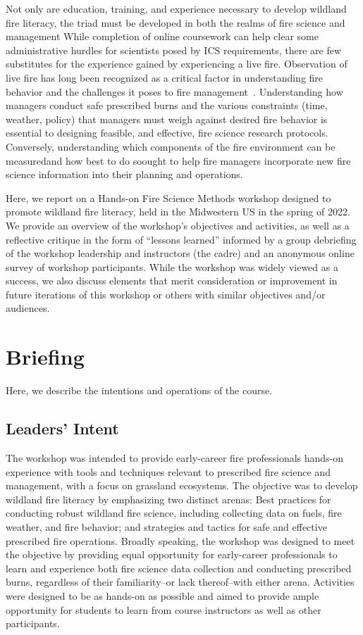 \documentclass[fire,casereport,accept,moreauthors,pdftex]{Definitions/mdpi}  %
\begin{document}
Not only are education, training, and experience necessary to develop wildland fire literacy, the triad must be developed in both the realms of fire science and management 
While completion of online coursework can help clear some administrative hurdles for scientists posed by ICS requirements, there are few substitutes for the experience gained by experiencing a live fire.
Observation of live fire has long been recognized as a critical factor in understanding fire behavior and the challenges it poses to fire management~\citep{alexander1990, andrews1989}.
Understanding how managers conduct safe prescribed burns and the various constraints (time, weather, policy) that managers must weigh against desired fire behavior is essential to designing feasible, and effective, fire science research protocols.
Conversely, understanding which components of the fire environment can be measured\textemdash and how best to do so\textemdash ought to help fire managers incorporate new fire science information into their planning and operations.

Here, we report on a Hands-on Fire Science Methods workshop designed to promote wildland fire literacy, held in the Midwestern US in the spring of 2022.
We provide an overview of the workshop's objectives and activities, as well as a reflective critique in the form of ``lessons learned'' informed by a group debriefing of the workshop leadership and instructors (the cadre) and an anonymous online survey of workshop participants.
While the workshop was widely viewed as a success, we also discuss elements that merit consideration or improvement in future iterations of this workshop or others with similar objectives and/or audiences.

\section{Briefing} 

Here, we describe the intentions and operations of the course.

\subsection{Leaders' Intent}

The workshop was intended to provide early-career fire professionals hands-on experience with tools and techniques relevant to prescribed fire science and management, with a focus on grassland ecosystems.
The objective was to develop wildland fire literacy by emphasizing two distinct arenas: Best practices for conducting robust wildland fire science, including collecting data on fuels, fire weather, and fire behavior; and strategies and tactics for safe and effective prescribed fire operations.
Broadly speaking, the workshop was designed to meet the objective by providing equal opportunity for early-career professionals to learn and experience both fire science data collection and conducting prescribed burns, regardless of their familiarity--or lack thereof--with either arena.
Activities were designed to be as hands-on as possible and aimed to provide ample opportunity for students to learn from course instructors as well as other participants.
\end{document}
